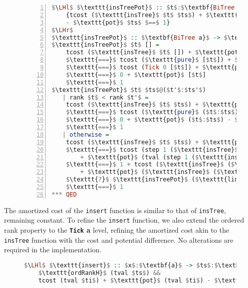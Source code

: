 \documentclass{clmthesis}
\begin{document}
\begin{figure}[h]
\begin{lstlisting}[mathescape=true, language=haskell, numbers=left, caption={Proof of amortized cost analysis of \texttt{insTree}.},captionpos=b, label=fig:proofPot]
$\LHl$ $\texttt{insTreePot}$ :: $t$:$\textbf{BiTree a}$ -> $ts$:$\textbf{BiHeap a}$ ->
	{tcost ($\texttt{insTree}$ $t$ $ts$) + $\texttt{pot}$ (tval ($\texttt{insTree}$ $t$ $ts$)) 
	- $\texttt{pot}$ $ts$ $==$ 1} 
$\LHr$
$\texttt{insTreePot}$ :: $\textbf{BiTree a}$ -> $\textbf{[BiTree a]}$ -> $\textbf{Proof}$
$\texttt{insTreePot}$ $t$ [] =
	tcost ($\texttt{insTree}$ $t$ []) + $\texttt{pot}$ (tval ($\texttt{insTree}$ $t$ [])) - $\texttt{pot}$ []
	$\texttt{===}$ tcost ($\texttt{pure}$ [$t$]) + $\texttt{pot}$ (tval ($\texttt{pure}$ [$t$]))
	$\texttt{===}$ tcost (Tick 0 [$t$]) + $\texttt{pot}$ (tval (Tick 0 [$t$]))
	$\texttt{===}$ 0 + $\texttt{pot}$ [$t$]
	$\texttt{===}$ 1
$\texttt{insTreePot}$ $t$ $ts$@($t'$:$ts'$)
   | rank $t$ < rank $t'$ = 
	tcost ($\texttt{insTree}$ $t$ $ts$) + $\texttt{pot}$ (tval ($\texttt{insTree}$ $t$ $ts$)) - $\texttt{pot}$ $ts$ 
	$\texttt{===}$ tcost ($\texttt{pure}$ ($t$:$ts$)) + $\texttt{pot}$ (tval (pure ($t$:$ts$))) - $\texttt{pot}$ $ts$
	$\texttt{===}$ 0 + $\texttt{pot}$ ($t$:$ts$) - $\texttt{pot}$ $ts$
	$\texttt{===}$ 1
   | otherwise =
	tcost ($\texttt{insTree}$ $t$ $ts$) + $\texttt{pot}$ (tval ($\texttt{insTree}$ $t$ $ts$)) - $\texttt{pot}$ $ts$
	$\texttt{===}$ tcost (step 1 ($\texttt{insTree}$ ($\texttt{link}$ $t$ $t'$) $ts'$)) 
	    + $\texttt{pot}$ (tval (step 1 ($\texttt{insTree}$ ($\texttt{link}$ $t$ $t'$) $ts'$))) - $\texttt{pot}$ $ts$
	$\texttt{===}$ 1 + tcost ($\texttt{insTree}$ ($\texttt{link}$ $t$ $t'$) $ts'$)) 
	    + $\texttt{pot}$ ($\texttt{insTree}$ ($\texttt{link}$ $t$ $t'$) $ts'$)) - $\texttt{pot}$ $ts'$ - 1
	$\texttt{?}$ $\texttt{insTreePot}$ ($\texttt{link}$ $t$ $t'$) $ts'$
	$\texttt{===}$ 1
*** QED
\end{lstlisting}
\end{figure} 


The amortized cost of the \texttt{insert} function is similar to that of \texttt{insTree}, remaining constant. To refine the \texttt{insert} function, we also extend the ordered rank property to the \textbf{\lstinline{Tick} a} level, refining the amortized cost akin to the \texttt{insTree} function with the cost and potential difference. No alterations are required in the implementation.

\begin{figure}[h]
\begin{lstlisting}[mathescape=true, language=haskell, caption={Amortized cost analysis of \texttt{insert}.},captionpos=b]
$\LHl$ $\texttt{insert}$ :: $x$:$\textbf{a}$ -> $ts$:$\textbf{BiHeap a}$  -> {$ti$:$\textbf{Tick ([BiTree a])}$ | 
	$\texttt{ordRankH}$ (tval $ts$) && 
	tcost (tval $ti$) + $\texttt{pot}$ (tval $ti$) - $\texttt{pot}$ $ts$ $\leq 2$}  $\LHr$
\end{lstlisting}
\end{figure}
\end{document}
